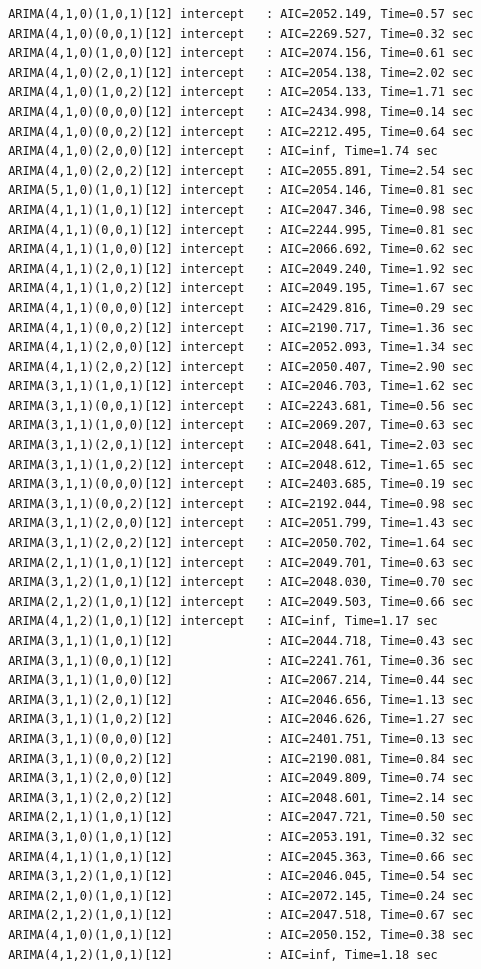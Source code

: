 \documentclass[a4paper, 12pt]{article}
\begin{document}
\begin{verbatim}
 ARIMA(4,1,0)(1,0,1)[12] intercept   : AIC=2052.149, Time=0.57 sec
 ARIMA(4,1,0)(0,0,1)[12] intercept   : AIC=2269.527, Time=0.32 sec
 ARIMA(4,1,0)(1,0,0)[12] intercept   : AIC=2074.156, Time=0.61 sec
 ARIMA(4,1,0)(2,0,1)[12] intercept   : AIC=2054.138, Time=2.02 sec
 ARIMA(4,1,0)(1,0,2)[12] intercept   : AIC=2054.133, Time=1.71 sec
 ARIMA(4,1,0)(0,0,0)[12] intercept   : AIC=2434.998, Time=0.14 sec
 ARIMA(4,1,0)(0,0,2)[12] intercept   : AIC=2212.495, Time=0.64 sec
 ARIMA(4,1,0)(2,0,0)[12] intercept   : AIC=inf, Time=1.74 sec
 ARIMA(4,1,0)(2,0,2)[12] intercept   : AIC=2055.891, Time=2.54 sec
 ARIMA(5,1,0)(1,0,1)[12] intercept   : AIC=2054.146, Time=0.81 sec
 ARIMA(4,1,1)(1,0,1)[12] intercept   : AIC=2047.346, Time=0.98 sec
 ARIMA(4,1,1)(0,0,1)[12] intercept   : AIC=2244.995, Time=0.81 sec
 ARIMA(4,1,1)(1,0,0)[12] intercept   : AIC=2066.692, Time=0.62 sec
 ARIMA(4,1,1)(2,0,1)[12] intercept   : AIC=2049.240, Time=1.92 sec
 ARIMA(4,1,1)(1,0,2)[12] intercept   : AIC=2049.195, Time=1.67 sec
 ARIMA(4,1,1)(0,0,0)[12] intercept   : AIC=2429.816, Time=0.29 sec
 ARIMA(4,1,1)(0,0,2)[12] intercept   : AIC=2190.717, Time=1.36 sec
 ARIMA(4,1,1)(2,0,0)[12] intercept   : AIC=2052.093, Time=1.34 sec
 ARIMA(4,1,1)(2,0,2)[12] intercept   : AIC=2050.407, Time=2.90 sec
 ARIMA(3,1,1)(1,0,1)[12] intercept   : AIC=2046.703, Time=1.62 sec
 ARIMA(3,1,1)(0,0,1)[12] intercept   : AIC=2243.681, Time=0.56 sec
 ARIMA(3,1,1)(1,0,0)[12] intercept   : AIC=2069.207, Time=0.63 sec
 ARIMA(3,1,1)(2,0,1)[12] intercept   : AIC=2048.641, Time=2.03 sec
 ARIMA(3,1,1)(1,0,2)[12] intercept   : AIC=2048.612, Time=1.65 sec
 ARIMA(3,1,1)(0,0,0)[12] intercept   : AIC=2403.685, Time=0.19 sec
 ARIMA(3,1,1)(0,0,2)[12] intercept   : AIC=2192.044, Time=0.98 sec
 ARIMA(3,1,1)(2,0,0)[12] intercept   : AIC=2051.799, Time=1.43 sec
 ARIMA(3,1,1)(2,0,2)[12] intercept   : AIC=2050.702, Time=1.64 sec
 ARIMA(2,1,1)(1,0,1)[12] intercept   : AIC=2049.701, Time=0.63 sec
 ARIMA(3,1,2)(1,0,1)[12] intercept   : AIC=2048.030, Time=0.70 sec
 ARIMA(2,1,2)(1,0,1)[12] intercept   : AIC=2049.503, Time=0.66 sec
 ARIMA(4,1,2)(1,0,1)[12] intercept   : AIC=inf, Time=1.17 sec
 ARIMA(3,1,1)(1,0,1)[12]             : AIC=2044.718, Time=0.43 sec
 ARIMA(3,1,1)(0,0,1)[12]             : AIC=2241.761, Time=0.36 sec
 ARIMA(3,1,1)(1,0,0)[12]             : AIC=2067.214, Time=0.44 sec
 ARIMA(3,1,1)(2,0,1)[12]             : AIC=2046.656, Time=1.13 sec
 ARIMA(3,1,1)(1,0,2)[12]             : AIC=2046.626, Time=1.27 sec
 ARIMA(3,1,1)(0,0,0)[12]             : AIC=2401.751, Time=0.13 sec
 ARIMA(3,1,1)(0,0,2)[12]             : AIC=2190.081, Time=0.84 sec
 ARIMA(3,1,1)(2,0,0)[12]             : AIC=2049.809, Time=0.74 sec
 ARIMA(3,1,1)(2,0,2)[12]             : AIC=2048.601, Time=2.14 sec
 ARIMA(2,1,1)(1,0,1)[12]             : AIC=2047.721, Time=0.50 sec
 ARIMA(3,1,0)(1,0,1)[12]             : AIC=2053.191, Time=0.32 sec
 ARIMA(4,1,1)(1,0,1)[12]             : AIC=2045.363, Time=0.66 sec
 ARIMA(3,1,2)(1,0,1)[12]             : AIC=2046.045, Time=0.54 sec
 ARIMA(2,1,0)(1,0,1)[12]             : AIC=2072.145, Time=0.24 sec
 ARIMA(2,1,2)(1,0,1)[12]             : AIC=2047.518, Time=0.67 sec
 ARIMA(4,1,0)(1,0,1)[12]             : AIC=2050.152, Time=0.38 sec
 ARIMA(4,1,2)(1,0,1)[12]             : AIC=inf, Time=1.18 sec


\end{verbatim}
\end{document}

